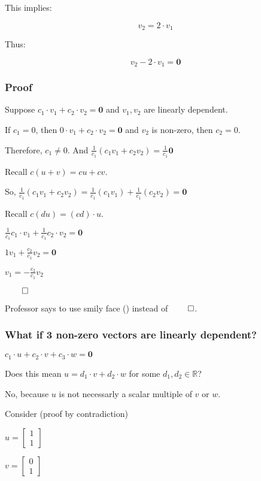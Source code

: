 \documentclass[12pt]{article}
\begin{document}
This implies:

\[
v_2 = 2 \cdot v_1
\]

Thus:

\[
v_2 - 2 \cdot v_1 = \mathbf{0}
\]

\subsubsection{Proof}

Suppose $c_1 \cdot v_1 + c_2 \cdot v_2 = \mathbf{0}$ and $v_1, v_2$ are
linearly dependent.

If $c_1 = 0$, then $0 \cdot v_1 + c_2 \cdot v_2 = \mathbf{0}$ and $v_2$ is
non-zero, then $c_2 = 0$.

Therefore, $c_1 \neq 0$.
And $\frac{1}{c_1}(c_1v_1 + c_2v_2) = \frac{1}{c_1}\mathbf{0}$

Recall $c(u + v) = cu + cv$.

So, $\frac{1}{c_1}(c_1v_1 + c_2v_2) = \frac{1}{c_1}(c_1v_1) + \frac{1}{c_1}(c_2v_2) = \mathbf{0}$

Recall $c(d u) = (cd)\cdot u$.

$\frac{1}{c_1}c_1 \cdot v_1 + \frac{1}{c_1}c_2 \cdot v_2 = \mathbf{0}$

$1v_1 + \frac{c_2}{c_1}v_2 = \mathbf{0}$

$v_1 = -\frac{c_2}{c_1}v_2$

$\qed$

Professor says to use smily face (\smiley) instead of $\qed$.

\subsubsection{What if 3 non-zero vectors are linearly dependent?}

$c_1 \cdot u + c_2 \cdot v + c_3 \cdot w = \mathbf{0}$

Does this mean $u = d_1 \cdot v + d_2 \cdot w$ for some $d_1, d_2 \in \mathbb{R}$?

No, because $u$ is not necessarly a scalar multiple of $v$ or $w$.

Consider (proof by contradiction)

$u = \begin{bmatrix} 1 \\ 1 \end{bmatrix}$

$v = \begin{bmatrix} 0 \\ 1 \end{bmatrix}$
\end{document}

